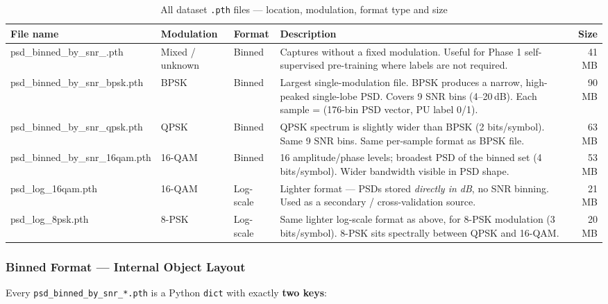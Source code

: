 \documentclass[11pt,a4paper]{article}
\begin{document}
\begin{table}[h!]
\centering
\caption{All dataset \texttt{.pth} files — location, modulation, format type and size}
\renewcommand{\arraystretch}{1.4}
\begin{tabularx}{\textwidth}{>{\ttfamily\footnotesize}l l l X r}
\toprule
\textbf{File name} & \textbf{Modulation} & \textbf{Format} & \textbf{Description} & \textbf{Size}\\
\midrule

psd\_binned\_by\_snr\_.pth
  & Mixed / unknown & Binned
  & Captures without a fixed modulation. Useful for Phase 1
    self-supervised pre-training where labels are not required.
  & 41 MB \\[4pt]

psd\_binned\_by\_snr\_bpsk.pth
  & BPSK & Binned
  & Largest single-modulation file. BPSK produces a narrow,
    high-peaked single-lobe PSD. Covers 9 SNR bins (4–20\,dB).
    Each sample = (176-bin PSD vector, PU label 0/1).
  & 90 MB \\[4pt]

psd\_binned\_by\_snr\_qpsk.pth
  & QPSK & Binned
  & QPSK spectrum is slightly wider than BPSK (2 bits/symbol).
    Same 9 SNR bins. Same per-sample format as BPSK file.
  & 63 MB \\[4pt]

psd\_binned\_by\_snr\_16qam.pth
  & 16-QAM & Binned
  & 16 amplitude/phase levels; broadest PSD of the binned set
    (4 bits/symbol). Wider bandwidth visible in PSD shape.
  & 53 MB \\[4pt]

psd\_log\_16qam.pth
  & 16-QAM & Log-scale
  & Lighter format — PSDs stored \emph{directly in dB},
    no SNR binning. Used as a secondary / cross-validation source.
  & 21 MB \\[4pt]

psd\_log\_8psk.pth
  & 8-PSK & Log-scale
  & Same lighter log-scale format as above, for 8-PSK modulation
    (3 bits/symbol). 8-PSK sits spectrally between QPSK and 16-QAM.
  & 20 MB \\
\bottomrule
\end{tabularx}
\end{table}

\subsubsection{Binned Format — Internal Object Layout}

Every \texttt{psd\_binned\_by\_snr\_*.pth} is a Python \texttt{dict}
with exactly \textbf{two keys}:
\end{document}
